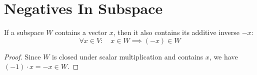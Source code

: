 \section{Negatives In Subspace}

\begin{theorem}
  \label{theorem : subspace_neg}
  \leanok
  If a subspace $W$ contains a vector $x$, then it also contains its additive inverse $-x$:
  $$\forall x \in V: \quad x \in W \implies (-x) \in W$$
\end{theorem}

\begin{proof}
  Since $W$ is closed under scalar multiplication and contains $x$, we have $(-1) \cdot x = -x \in W$.
\end{proof}